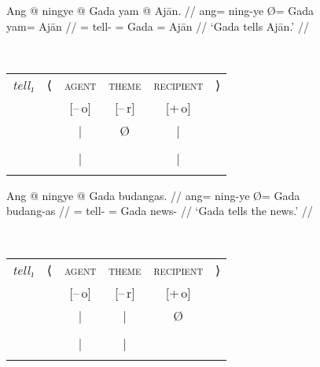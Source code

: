 \begin{figure}
\pex\label{ex:intrnzn_act}
\a\label{ex:intrnzn_act_1}%
\ljudge\ques\begin{minipage}[t]{.4\remaining}
\begingl
	\gla Ang @ ningye {} @ Gada yam @ Ajān. //
	\glb ang= ning-ye Ø= Gada yam= Ajān //
	\glc \AgtT{}= tell-\TsgF{} \Top{}= Gada \Dat{}= Ajān //
	\glft `\ques{}Gada tells Ajān.' //
\endgl
\end{minipage}
~
\begin{tabular}[t]{>{\itshape}l l c c c r}
tell₁
	& ⟨
	& \textsc{agent}
	& \textsc{theme}
	& \textsc{recipient}
	& ⟩
	\\
%
	& %
	& [–\,o]
	& [–\,r]
	& [+\,o]
	& %
	\\

%
	& %
	& |
	& Ø
	& |
	& %
	\\

%
	& %
	& \Subj*
	& %
	& \Obj
	& %
	\\

%
	& %
	& |
	& %
	& |
	& %
	\\

%
	& %
	& \fw{Gada}
	& %
	& \fw{Ajān}
	& %
	\\
\end{tabular}

\a\label{ex:intrnzn_act_2}%
\begin{minipage}[t]{.4\remaining}
\begingl
	\gla Ang @ ningye {} @ Gada budangas. //
	\glb ang= ning-ye Ø= Gada budang-as //
	\glc \AgtT{}= tell-\TsgF{} \Top{}= Gada news-\Parg{} //
	\glft `Gada tells the news.' //
\endgl
\end{minipage}
~
\begin{tabular}[t]{>{\itshape}l l c c c r}
tell₁
	& ⟨
	& \textsc{agent}
	& \textsc{theme}
	& \textsc{recipient}
	& ⟩
	\\
%
	& %
	& [–\,o]
	& [–\,r]
	& [+\,o]
	& %
	\\

%
	& %
	& |
	& |
	& Ø
	& %
	\\

%
	& %
	& \Subj*
	& \SObj
	& %
	& %
	\\

%
	& %
	& |
	& |
	& %
	& %
	\\

%
	& %
	& \fw{Gada}
	& \fw{news}
	& %
	& %
	\\
\end{tabular}

\xe
\end{figure}


